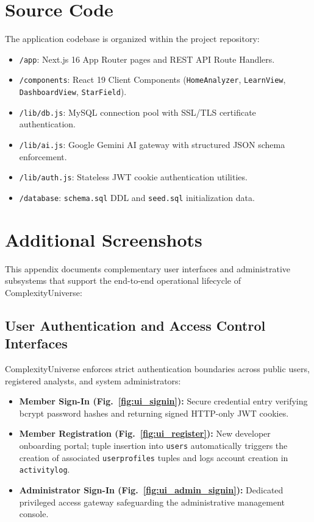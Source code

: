 \documentclass[12pt,a4paper]{report}
\DeclareRobustCommand{\_}{\textunderscore\allowbreak}
\begin{document}
\chapter{Source Code}
The application codebase is organized within the project repository:
\begin{itemize}
    \item \texttt{/app}: Next.js 16 App Router pages and REST API Route Handlers.
    \item \texttt{/components}: React 19 Client Components (\texttt{HomeAnalyzer}, \texttt{LearnView}, \texttt{DashboardView}, \texttt{StarField}).
    \item \texttt{/lib/db.js}: MySQL connection pool with SSL/TLS certificate authentication.
    \item \texttt{/lib/ai.js}: Google Gemini AI gateway with structured JSON schema enforcement.
    \item \texttt{/lib/auth.js}: Stateless JWT cookie authentication utilities.
    \item \texttt{/database}: \texttt{schema.sql} DDL and \texttt{seed.sql} initialization data.
\end{itemize}

\chapter{Additional Screenshots}
This appendix documents complementary user interfaces and administrative subsystems that support the end-to-end operational lifecycle of ComplexityUniverse:

\section{User Authentication and Access Control Interfaces}
ComplexityUniverse enforces strict authentication boundaries across public users, registered analysts, and system administrators:
\begin{itemize}
    \item \textbf{Member Sign-In (Fig.~\ref{fig:ui_signin}):} Secure credential entry verifying bcrypt password hashes and returning signed HTTP-only JWT cookies.
    \item \textbf{Member Registration (Fig.~\ref{fig:ui_register}):} New developer onboarding portal; tuple insertion into \texttt{users} automatically triggers the creation of associated \texttt{user\_profiles} tuples and logs account creation in \texttt{activity\_log}.
    \item \textbf{Administrator Sign-In (Fig.~\ref{fig:ui_admin_signin}):} Dedicated privileged access gateway safeguarding the administrative management console.
\end{itemize}
\end{document}
